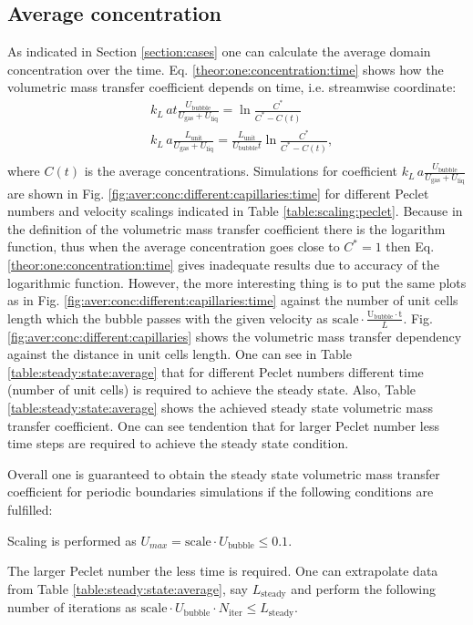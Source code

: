 \documentclass{article}
\newcommand{\beqal}{\begin{equation}\begin{aligned}}
\newcommand{\feqal}{\end{aligned}\end{equation}}
\newcommand{\vol}{k_L\,a}
\newcommand{\lunit}{L_{\mathrm{unit}}}
\newcommand{\ububble}{U_{\mathrm{bubble}}}
\newcommand{\uliq}{U_{\mathrm{liq}}}
\newcommand{\ugas}{U_{\mathrm{gas}}}
\newcommand{\cstar}{C^{*}}
\begin{document}
\subsection{Average concentration}
\label{main:results:periodic}
As indicated in Section \ref{section:cases} one can calculate the average domain concentration over
the time. Eq. \ref{theor:one:concentration:time} shows how 
the volumetric mass transfer coefficient depends on
time, i.e. streamwise coordinate:
\beqal
&\vol t \frac{\ububble}{\ugas+\uliq}=\ln\frac{\cstar}{\cstar-C(t)}\\
&\vol \frac{\lunit}{\ugas+\uliq}=\frac{\lunit}{\ububble t} \ln \frac{C^*}{C^*-C(t)},\\
\feqal
where $C(t)$ is the average concentrations.
Simulations for coefficient $\vol \frac{\ububble}{\ugas+\uliq}$ are shown in Fig.
\ref{fig:aver:conc:different:capillaries:time} for different Peclet numbers and velocity scalings
indicated in Table \ref{table:scaling:peclet}. Because in the definition of the volumetric mass
transfer coefficient there is the logarithm function, thus when the average concentration goes
close to $\cstar=1$ then Eq. \ref{theor:one:concentration:time} gives inadequate results due to
 accuracy of the logarithmic function. However, the more interesting thing is to put the same plots
as in Fig. \ref{fig:aver:conc:different:capillaries:time} against the number of unit cells length
which the bubble passes with the given velocity as $\mathrm{scale}\cdot\frac{\mathrm{\ububble\cdot
t}}{L}$. Fig. \ref{fig:aver:conc:different:capillaries} shows the volumetric mass transfer
dependency against the distance in unit cells length. One can see in Table
\ref{table:steady:state:average} that for different Peclet numbers different time (number of unit
cells) is required to achieve the steady state. Also, Table \ref{table:steady:state:average} shows
the achieved steady state volumetric mass transfer coefficient. One can see tendention that for
larger Peclet number less time steps are required to achieve the steady state condition. 

Overall one is guaranteed to obtain the steady state volumetric mass transfer coefficient for
periodic boundaries simulations if the following conditions are fulfilled:
\begin{description}
\item Scaling is performed as $U_{max}=\mathrm{scale}\cdot\ububble\leq 0.1$.
\item The larger Peclet number the less time is required. One can extrapolate data from Table
\ref{table:steady:state:average}, say $L_{\mathrm{steady}}$ and perform the following number of
iterations as $\mathrm{scale}\cdot \ububble\cdot N_{\mathrm{iter}}\leq L_{\mathrm{steady}}$. 
\end{description}
\end{document}
